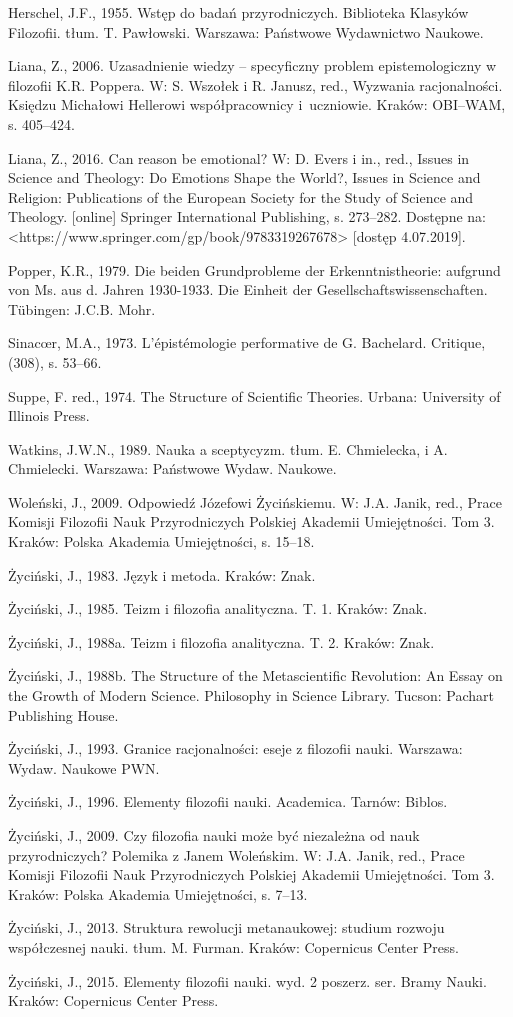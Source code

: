 \documentclass{article}
\begin{document}
Herschel, J.F., 1955. Wstęp do badań przyrodniczych. Biblioteka Klasyków Filozofii. tłum. T. Pawłowski. Warszawa:
Państwowe Wydawnictwo Naukowe.

Liana, Z., 2006. Uzasadnienie wiedzy – specyficzny problem epistemologiczny w filozofii K.R. Poppera. W: S. Wszołek i R.
Janusz, red., Wyzwania racjonalności. Księdzu Michałowi Hellerowi współpracownicy i~uczniowie. Kraków: OBI–WAM, s.
405–424.

Liana, Z., 2016. Can reason be emotional? W: D. Evers i in., red., Issues in Science and Theology: Do Emotions Shape the
World?, Issues in Science and Religion: Publications of the European Society for the Study of Science and Theology.
[online] Springer International Publishing, s. 273–282. Dostępne na:
{\textless}https://www.springer.com/gp/book/9783319267678{\textgreater} [dostęp 4.07.2019].

Popper, K.R., 1979. Die beiden Grundprobleme der Erkenntnistheorie: aufgrund von Ms. aus d. Jahren 1930-1933. Die
Einheit der Gesellschaftswissenschaften. Tübingen: J.C.B. Mohr.

Sinacœr, M.A., 1973. L’épistémologie performative de G. Bachelard. Critique, (308), s. 53–66.

Suppe, F. red., 1974. The Structure of Scientific Theories. Urbana: University of Illinois Press.

Watkins, J.W.N., 1989. Nauka a sceptycyzm. tłum. E. Chmielecka, i A. Chmielecki. Warszawa: Państwowe Wydaw. Naukowe.

Woleński, J., 2009. Odpowiedź Józefowi Życińskiemu. W: J.A. Janik, red., Prace Komisji Filozofii Nauk Przyrodniczych
Polskiej Akademii Umiejętności. Tom 3. Kraków: Polska Akademia Umiejętności, s. 15–18.

Życiński, J., 1983. Język i metoda. Kraków: Znak.

Życiński, J., 1985. Teizm i filozofia analityczna. T. 1. Kraków: Znak.

Życiński, J., 1988a. Teizm i filozofia analityczna. T. 2. Kraków: Znak.

Życiński, J., 1988b. The Structure of the Metascientific Revolution: An Essay on the Growth of Modern Science.
Philosophy in Science Library. Tucson: Pachart Publishing House.

Życiński, J., 1993. Granice racjonalności: eseje z filozofii nauki. Warszawa: Wydaw. Naukowe PWN.

Życiński, J., 1996. Elementy filozofii nauki. Academica. Tarnów: Biblos.

Życiński, J., 2009. Czy filozofia nauki może być niezależna od nauk przyrodniczych? Polemika z Janem Woleńskim. W: J.A.
Janik, red., Prace Komisji Filozofii Nauk Przyrodniczych Polskiej Akademii Umiejętności. Tom 3. Kraków: Polska Akademia
Umiejętności, s. 7–13.

Życiński, J., 2013. Struktura rewolucji metanaukowej: studium rozwoju współczesnej nauki. tłum. M. Furman. Kraków:
Copernicus Center Press.

Życiński, J., 2015. Elementy filozofii nauki. wyd. 2 poszerz. ser. Bramy Nauki. Kraków: Copernicus Center Press.
\end{document}
